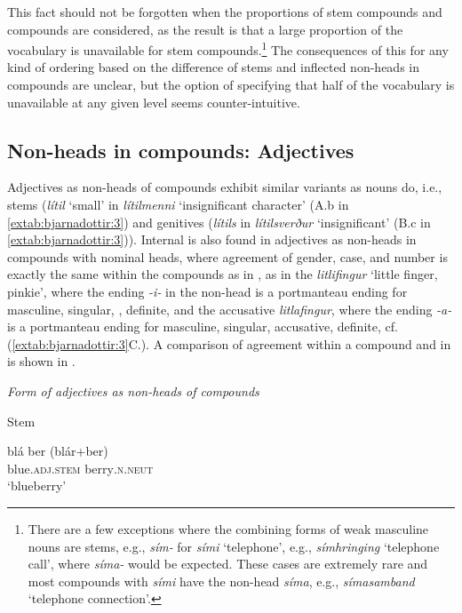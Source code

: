 \documentclass[output=paper]{LSP/langsci}
\begin{document}
\begin{xlist}
This fact should not be forgotten when the proportions of stem compounds and  compounds are considered, as the result is that a large proportion of the vocabulary is unavailable for stem compounds.\footnote{There are a few exceptions where the combining forms of weak masculine nouns are stems, e.g., \textit{sím-} for \textit{sími} `telephone', e.g., \textit{símhringing} ‘telephone call’, where \textit{síma-} would be expected. These cases are extremely rare and most compounds with \textit{sími} have the  non-head \textit{síma}, e.g., \textit{símasamband} ‘telephone connection’.} The consequences of this for any kind of ordering based on the difference of stems and inflected non-heads in compounds are unclear, but the option of specifying that half of the vocabulary is unavailable at any given level seems counter-intuitive. 

\subsection{Non-heads in compounds: Adjectives} \label{sec:bjarnadottir:2.6}

Adjectives as non-heads of compounds exhibit similar variants as nouns do, i.e., stems (\textit{lítil} ‘small’ in \textit{lítilmenni} ‘insignificant character’ (A.b in \ref{extab:bjarnadottir:3}) and genitives (\textit{lítils} in \textit{lítilsverður} ‘insignificant’ (B.c in \ref{extab:bjarnadottir:3})). Internal  is also found in adjectives as non-heads in compounds with nominal heads, where agreement of  gender, case, and number is exactly the same within the compounds as in , 
as in the  \textit{litlifingur} ‘little finger, pinkie’, where the ending \textit{-i-} in the non-head is a portmanteau  ending for masculine, singular, , definite, and the accusative \textit{litlafingur}, where the ending \textit{-a-} is a portmanteau  ending for masculine, singular, accusative, definite, cf. (\ref{extab:bjarnadottir:3}C.). A comparison of agreement within a compound and in  is shown in .

\ea
\label{extab:bjarnadottir:3}
{\textit{Form of adjectives as non-heads of compounds}}
\begin{xlist}
 Stem 
\begin{xlist}
	\gll blá ber  (blár+ber)\\
	 blue\textsc{.adj.stem} berry\textsc{.n.neut}\\
	\glt ‘blueberry’


\end{xlist}
\end{xlist}
\end{xlist}
\end{document}

